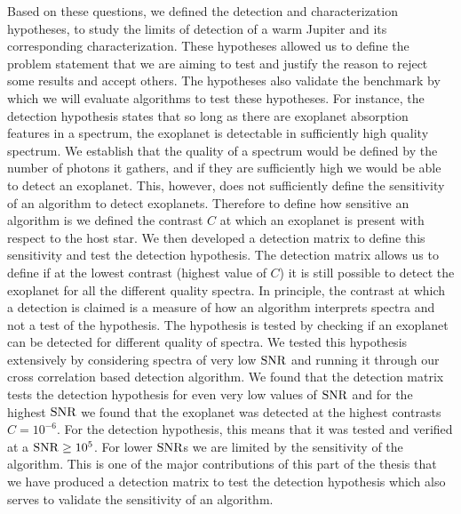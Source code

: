 Based on these questions, we defined the detection and characterization hypotheses, to study the limits of detection of a warm Jupiter and its corresponding characterization.
These hypotheses allowed us to define the problem statement that we are aiming to test and justify the reason to reject some results and accept others. 
The hypotheses also validate the benchmark by which we will evaluate algorithms to test these hypotheses.
For instance, the detection hypothesis states that so long as there are exoplanet absorption features in a spectrum, the exoplanet is detectable in sufficiently high quality spectrum. 
We establish that the quality of a spectrum would be defined by the number of photons it gathers, and if they are sufficiently high we would be able to detect an exoplanet. 
This, however, does not sufficiently define the sensitivity of an algorithm to detect exoplanets. 
Therefore to define how sensitive an algorithm is we defined the contrast $C$ at which an exoplanet is present with respect to the host star.
We then developed a detection matrix to define this sensitivity and test the detection hypothesis.
The detection matrix allows us to define if at the lowest contrast (highest value of $C$) it is still possible to detect the exoplanet for all the different quality spectra.
In principle, the contrast at which a detection is claimed is a measure of how an algorithm interprets spectra and not a test of the hypothesis.
The hypothesis is tested by checking if an exoplanet can be detected for different quality of spectra. 
We tested this hypothesis extensively by considering spectra of very low $\rm{SNR}$ and running it through our cross correlation based detection algorithm.
We found that the detection matrix tests the detection hypothesis for even very low values of $\rm{SNR}$ and for the highest $\rm{SNR}$ we found that the exoplanet was detected at the highest contrasts $C=10^{-6}$.
For the detection hypothesis, this means that it was tested and verified at a $\rm{SNR}\ge10^{5}$.
For lower $\rm{SNR}$s we are limited by the sensitivity of the algorithm. 
This is one of the major contributions of this part of the thesis that we have produced a detection matrix to test the detection hypothesis which also serves to validate the sensitivity of an algorithm.

